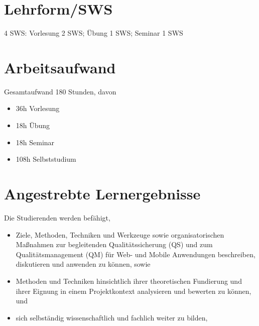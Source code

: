 \section*{Lehrform/SWS\label{/mi-2017/modulbeschreibungen-master/MA_WTW_Modul_QUS_Winter}}\label{lehrformswspathlabelmi-2017modulbeschreibungen-mastermaux5fwtwux5fmodulux5fqusux5fwinter}

4 SWS: Vorlesung 2 SWS; Übung 1 SWS; Seminar 1 SWS

\section*{Arbeitsaufwand\label{/mi-2017/modulbeschreibungen-master/MA_WTW_Modul_QUS_Winter}}\label{arbeitsaufwandpathlabelmi-2017modulbeschreibungen-mastermaux5fwtwux5fmodulux5fqusux5fwinter}

Gesamtaufwand 180 Stunden, davon

\begin{itemize}
\tightlist
\item
  36h Vorlesung
\item
  18h Übung
\item
  18h Seminar
\item
  108h Selbststudium
\end{itemize}

\section*{Angestrebte
Lernergebnisse\label{/mi-2017/modulbeschreibungen-master/MA_WTW_Modul_QUS_Winter}}\label{angestrebte-lernergebnissepathlabelmi-2017modulbeschreibungen-mastermaux5fwtwux5fmodulux5fqusux5fwinter}

Die Studierenden werden befähigt,

\begin{itemize}
\tightlist
\item
  Ziele, Methoden, Techniken und Werkzeuge sowie organisatorischen
  Maßnahmen zur begleitenden Qualitätssicherung (QS) und zum
  Qualitätsmanagement (QM) für Web- und Mobile Anwendungen beschreiben,
  diskutieren und anwenden zu können, sowie
\item
  Methoden und Techniken hinsichtlich ihrer theoretischen Fundierung und
  ihrer Eignung in einem Projektkontext analysieren und bewerten zu
  können, und
\item
  sich selbständig wissenschaftlich und fachlich weiter zu bilden,
\end{itemize}

